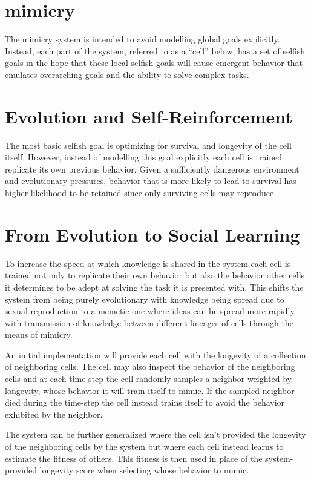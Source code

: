 \documentclass[a4paper]{article}
\begin{document}
\section{mimicry}

The mimicry system is intended to avoid modelling global goals explicitly.
%
Instead, each part of the system, referred to as a ``cell'' below, has a set of selfish goals in the hope that these local selfish goals will cause emergent behavior that emulates overarching goals and the ability to solve complex tasks.

\section{Evolution and Self-Reinforcement}

The most basic selfish goal is optimizing for survival and longevity of the cell itself. 
%
However, instead of modelling this goal explicitly each cell is trained replicate its own previous behavior.
%
Given a sufficiently dangerous environment and evolutionary pressures, behavior that is more likely to lead to survival has higher likelihood to be retained since only surviving cells may reproduce.

\section{From Evolution to Social Learning}

To increase the speed at which knowledge is shared in the system each cell is trained not only to replicate their own behavior but also the behavior other cells it determines to be adept at solving the task it is presented with.
%
This shifts the system from being purely evolutionary with knowledge being spread due to sexual reproduction to a memetic one where ideas can be spread more rapidly with transmission of knowledge between different lineages of cells through the means of mimicry.

An initial implementation will provide each cell with the longevity of a collection of neighboring cells.
%
The cell may also inspect the behavior of the neighboring cells and at each time-step the cell randomly samples a neighbor weighted by longevity, whose behavior it will train itself to mimic.
%
If the sampled neighbor died during the time-step the cell instead trains itself to avoid the behavior exhibited by the neighbor.

The system can be further generalized where the cell isn't provided the longevity of the neighboring cells by the system but where each cell instead learns to estimate the fitness of others.
%
This fitness is then used in place of the system-provided longevity score when selecting whose behavior to mimic.
\end{document}
